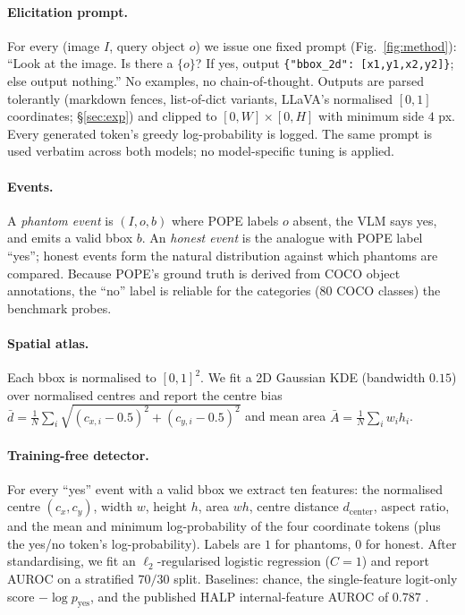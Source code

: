 \documentclass[10pt,twocolumn,letterpaper]{article}
\begin{document}
\paragraph{Elicitation prompt.} For every (image $I$, query object
$o$) we issue one fixed prompt (Fig.~\ref{fig:method}):
``Look at the image. Is there a $\{o\}$? If yes, output
\texttt{\{"bbox\_2d": [x1,y1,x2,y2]\}}; else output nothing.'' No
examples, no chain-of-thought. Outputs are parsed tolerantly
(markdown fences, list-of-dict variants, LLaVA's normalised $[0,1]$
coordinates; \S\ref{sec:exp}) and clipped to $[0,W]\times[0,H]$ with
minimum side $4$ px. Every generated token's greedy log-probability is
logged. The same prompt is used verbatim across both models; no
model-specific tuning is applied.

\paragraph{Events.} A \emph{phantom event} is $(I, o, b)$ where POPE
labels $o$ absent, the VLM says yes, and emits a valid bbox $b$. An
\emph{honest event} is the analogue with POPE label ``yes''; honest
events form the natural distribution against which phantoms are
compared. Because POPE's ground truth is derived from COCO object
annotations, the ``no'' label is reliable for the categories
(80 COCO classes) the benchmark probes.

\paragraph{Spatial atlas.} \label{sec:atlas}
Each bbox is normalised to $[0,1]^2$. We fit a 2D Gaussian KDE
(bandwidth $0.15$) over normalised centres and report the
centre bias
$\bar{d} = \tfrac{1}{N}\sum_i \sqrt{(c_{x,i}-0.5)^2 + (c_{y,i}-0.5)^2}$
and mean area $\bar{A} = \tfrac{1}{N}\sum_i w_i h_i$.

\paragraph{Training-free detector.} \label{sec:detector}
For every ``yes'' event with a valid bbox we extract ten features:
the normalised centre $(c_x, c_y)$, width $w$, height $h$, area $wh$,
centre distance $d_\text{center}$, aspect ratio, and the mean and
minimum log-probability of the four coordinate tokens (plus the yes/no
token's log-probability). Labels are $1$ for phantoms, $0$ for honest.
After standardising, we fit an $\ell_2$-regularised logistic regression
($C{=}1$) and report AUROC on a stratified $70/30$ split. Baselines:
chance, the single-feature logit-only score $-\log p_\text{yes}$, and
the published HALP internal-feature AUROC of $0.787$ \cite{halp}.
\end{document}
